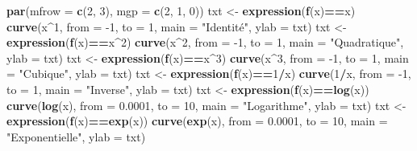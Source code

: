 \documentclass[]{article}
\newenvironment{Shaded}{\begin{snugshade}}{\end{snugshade}}
\newcommand{\DataTypeTok}[1]{\textcolor[rgb]{0.13,0.29,0.53}{#1}}
\newcommand{\DecValTok}[1]{\textcolor[rgb]{0.00,0.00,0.81}{#1}}
\newcommand{\FloatTok}[1]{\textcolor[rgb]{0.00,0.00,0.81}{#1}}
\newcommand{\KeywordTok}[1]{\textcolor[rgb]{0.13,0.29,0.53}{\textbf{#1}}}
\newcommand{\NormalTok}[1]{#1}
\newcommand{\OperatorTok}[1]{\textcolor[rgb]{0.81,0.36,0.00}{\textbf{#1}}}
\newcommand{\StringTok}[1]{\textcolor[rgb]{0.31,0.60,0.02}{#1}}
\begin{document}
\begin{Shaded}
\begin{Highlighting}[]
\KeywordTok{par}\NormalTok{(}\DataTypeTok{mfrow =} \KeywordTok{c}\NormalTok{(}\DecValTok{2}\NormalTok{, }\DecValTok{3}\NormalTok{), }\DataTypeTok{mgp =} \KeywordTok{c}\NormalTok{(}\DecValTok{2}\NormalTok{, }\DecValTok{1}\NormalTok{, }\DecValTok{0}\NormalTok{))}
\NormalTok{txt <-}\StringTok{ }\KeywordTok{expression}\NormalTok{(}\KeywordTok{f}\NormalTok{(x)}\OperatorTok{==}\NormalTok{x)}
\KeywordTok{curve}\NormalTok{(x}\OperatorTok{^}\DecValTok{1}\NormalTok{, }\DataTypeTok{from =} \DecValTok{-1}\NormalTok{, }\DataTypeTok{to =} \DecValTok{1}\NormalTok{, }\DataTypeTok{main =} \StringTok{"Identité"}\NormalTok{, }\DataTypeTok{ylab =}\NormalTok{ txt)}
\NormalTok{txt <-}\StringTok{ }\KeywordTok{expression}\NormalTok{(}\KeywordTok{f}\NormalTok{(x)}\OperatorTok{==}\NormalTok{x}\OperatorTok{^}\DecValTok{2}\NormalTok{)}
\KeywordTok{curve}\NormalTok{(x}\OperatorTok{^}\DecValTok{2}\NormalTok{, }\DataTypeTok{from =} \DecValTok{-1}\NormalTok{, }\DataTypeTok{to =} \DecValTok{1}\NormalTok{, }\DataTypeTok{main =} \StringTok{"Quadratique"}\NormalTok{, }\DataTypeTok{ylab =}\NormalTok{ txt)}
\NormalTok{txt <-}\StringTok{ }\KeywordTok{expression}\NormalTok{(}\KeywordTok{f}\NormalTok{(x)}\OperatorTok{==}\NormalTok{x}\OperatorTok{^}\DecValTok{3}\NormalTok{)}
\KeywordTok{curve}\NormalTok{(x}\OperatorTok{^}\DecValTok{3}\NormalTok{, }\DataTypeTok{from =} \DecValTok{-1}\NormalTok{, }\DataTypeTok{to =} \DecValTok{1}\NormalTok{, }\DataTypeTok{main =} \StringTok{"Cubique"}\NormalTok{, }\DataTypeTok{ylab =}\NormalTok{ txt)}
\NormalTok{txt <-}\StringTok{ }\KeywordTok{expression}\NormalTok{(}\KeywordTok{f}\NormalTok{(x)}\OperatorTok{==}\DecValTok{1}\OperatorTok{/}\NormalTok{x)}
\KeywordTok{curve}\NormalTok{(}\DecValTok{1}\OperatorTok{/}\NormalTok{x, }\DataTypeTok{from =} \DecValTok{-1}\NormalTok{, }\DataTypeTok{to =} \DecValTok{1}\NormalTok{, }\DataTypeTok{main =} \StringTok{"Inverse"}\NormalTok{, }\DataTypeTok{ylab =}\NormalTok{ txt)}
\NormalTok{txt <-}\StringTok{ }\KeywordTok{expression}\NormalTok{(}\KeywordTok{f}\NormalTok{(x)}\OperatorTok{==}\KeywordTok{log}\NormalTok{(x))}
\KeywordTok{curve}\NormalTok{(}\KeywordTok{log}\NormalTok{(x), }\DataTypeTok{from =} \FloatTok{0.0001}\NormalTok{, }\DataTypeTok{to =} \DecValTok{10}\NormalTok{, }\DataTypeTok{main =} \StringTok{"Logarithme"}\NormalTok{, }\DataTypeTok{ylab =}\NormalTok{ txt)}
\NormalTok{txt <-}\StringTok{ }\KeywordTok{expression}\NormalTok{(}\KeywordTok{f}\NormalTok{(x)}\OperatorTok{==}\KeywordTok{exp}\NormalTok{(x))}
\KeywordTok{curve}\NormalTok{(}\KeywordTok{exp}\NormalTok{(x), }\DataTypeTok{from =} \FloatTok{0.0001}\NormalTok{, }\DataTypeTok{to =} \DecValTok{10}\NormalTok{, }\DataTypeTok{main =} \StringTok{"Exponentielle"}\NormalTok{, }\DataTypeTok{ylab =}\NormalTok{ txt)}
\end{Highlighting}
\end{Shaded}
\end{document}
